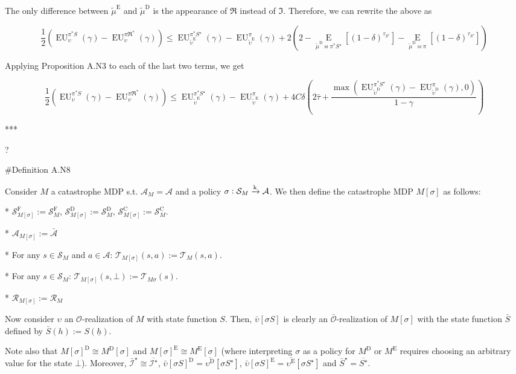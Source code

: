 \documentclass[a4paper]{article}
\newcommand{\AP}[1]{\left(#1\right)}
\newcommand{\AB}[1]{\left[#1\right]}
\newcommand{\Ea}[2]{\underset{#1}{\operatorname{E}}\AB{#2}}
\newcommand{\M}{\xrightarrow{\textnormal{k}}}
\newcommand{\Ob}{\mathcal{O}}
\newcommand{\A}{\mathcal{A}}
\newcommand{\St}{\mathcal{S}}
\newcommand{\T}{\mathcal{T}}
\newcommand{\R}{\mathcal{R}}
\newcommand{\In}{\mathcal{I}}
\newcommand{\Ado}{\bar{\Ob}}
\newcommand{\Ada}{\bar{\A}}
\newcommand{\RMC}{\mathrm{C}}
\newcommand{\RMD}{\mathrm{D}}
\newcommand{\RME}{\mathrm{E}}
\newcommand{\RMF}{\mathrm{F}}
\newcommand{\SF}{\St^{\RMF}}
\newcommand{\SD}{\St^{\RMD}}
\newcommand{\SC}{\St^{\RMC}}
\newcommand{\EU}{\operatorname{EU}}
\begin{document}
The only difference between $\tilde{\mu}^\RME$ and $\tilde{\mu}^\RMD$ is the appearance of $\Re$ instead of $\Im$. Therefore, we can rewrite the above as

$$\frac{1}{2}\AP{\EU_{\upsilon}^{\pi^* S}(\gamma)-\EU_{\upsilon}^{\pi\Re^*}(\gamma)} \leq \EU_{\tilde{\upsilon}^\RME}^{\pi^* S^\star}(\gamma)-\EU_{\tilde{\upsilon}^\RME}^{\pi}(\gamma) + 2\AP{2-\Ea{\tilde{\mu}^\RMD\bowtie\pi^*S^\star}{\AP{1-\delta}^{\tau_{S^\star}}}-\Ea{\tilde{\mu}^\RMD\bowtie\pi}{\AP{1-\delta}^{\tau_{S^\star}}}}$$

Applying Proposition A.N3 to each of the last two terms, we get

$$\frac{1}{2}\AP{\EU_{\upsilon}^{\pi^* S}(\gamma)-\EU_{\upsilon}^{\pi\Re^*}(\gamma)} \leq \EU_{\tilde{\upsilon}^\RME}^{\pi^* S^\star}(\gamma)-\EU_{\tilde{\upsilon}^\RME}^{\pi}(\gamma) + 4C\delta\AP{2\bar{\tau}+\frac{\max\AP{\EU_{\tilde{\upsilon}^\RMD}^{\pi^* S^\star}(\gamma)-\EU_{\tilde{\upsilon}^\RMD}^{\pi}(\gamma),0}}{1-\gamma}}$$

***

?

\#Definition A.N8

Consider $M$ a catastrophe MDP s.t. $\A_M = \A$ and a policy $\sigma: \St_M \M \A$. We then define the catastrophe MDP $M[\sigma]$ as follows:

* $\SF_{M[\sigma]} := \SF_M$, $\SD_{M[\sigma]} := \SD_M$, $\SC_{M[\sigma]} := \SC_M$.

* $\A_{M[\sigma]} := \Ada$

* For any $s \in \St_M$ and $a \in \A$: $\T_{M[\sigma]}(s,a) := \T_M(s,a)$.

* For any $s \in \St_M$: $\T_{M[\sigma]}(s,\bot) := \T_{M\sigma}(s)$. 

* $\R_{M[\sigma]} := \R_M$

Now consider $\upsilon$ an $\Ob$-realization of $M$ with state function $S$. Then, $\bar{\upsilon}[\sigma S]$ is clearly an $\Ado$-realization of $M[\sigma]$ with the state function $\bar{S}$ defined by $\bar{S}(h):=S\AP{\underline{h}}$.

Note also that $M[\sigma]^\RMD \cong M^\RMD[\sigma]$ and $M[\sigma]^\RME \cong M^\RME[\sigma]$ (where interpreting $\sigma$ as a policy for $M^\RMD$ or $M^\RME$ requires choosing an arbitrary value for the state $\bot$). Moreover, $\bar{\In}^\star \cong \overline{\In^\star}$, $\bar{\upsilon}[\sigma S]^\RMD = \overline{\upsilon^\RMD}[\sigma S^\star]$, $\bar{\upsilon}[\sigma S]^\RME = \overline{\upsilon^\RME}[\sigma S^\star]$ and $\bar{S}^\star = \overline{S^\star}$.
\end{document}
